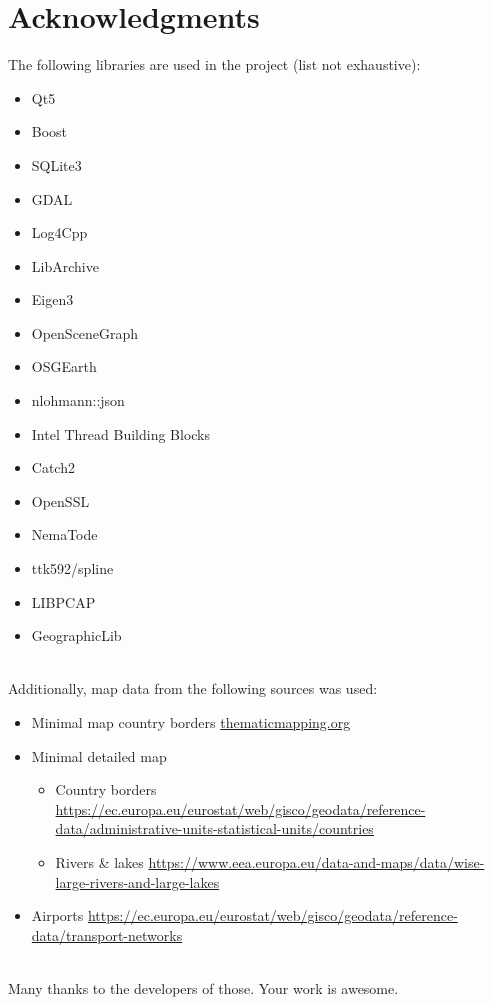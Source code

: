  \section{Acknowledgments}

The following libraries are used in the project (list not exhaustive):

\begin{itemize}  
\item Qt5
\item Boost
\item SQLite3
\item GDAL
\item Log4Cpp
\item LibArchive
\item Eigen3
\item OpenSceneGraph
\item OSGEarth
\item nlohmann::json
\item Intel Thread Building Blocks
\item Catch2
\item OpenSSL
\item NemaTode
\item ttk592/spline
\item LIBPCAP
\item GeographicLib
\end{itemize}
\ \\

Additionally, map data from the following sources was used:
\begin{itemize}  
\item Minimal map country borders \url{thematicmapping.org}
\item Minimal detailed map
\begin{itemize} 
\item Country borders \url{https://ec.europa.eu/eurostat/web/gisco/geodata/reference-data/administrative-units-statistical-units/countries}
\item Rivers \& lakes \url{https://www.eea.europa.eu/data-and-maps/data/wise-large-rivers-and-large-lakes}
\end{itemize}
\item Airports \url{https://ec.europa.eu/eurostat/web/gisco/geodata/reference-data/transport-networks}
\end{itemize}
\ \\

Many thanks to the developers of those. Your work is awesome.

